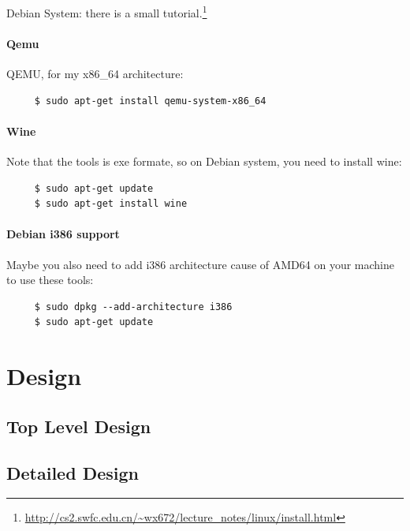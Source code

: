 \documentclass{swfcthesis}
\begin{document}
Debian System: there is a small
tutorial.\footnote{\url{http://cs2.swfc.edu.cn/~wx672/lecture_notes/linux/install.html}}

\subsubsection{Qemu}
\label{sec:qemu}


QEMU, for my x86\_64 architecture: 
\begin{verbatim}
     $ sudo apt-get install qemu-system-x86_64
\end{verbatim}

\subsubsection{Wine}
\label{sec:wine}


Note that the tools is exe formate, so on Debian system, you need to install wine:
\begin{verbatim}
     $ sudo apt-get update
     $ sudo apt-get install wine
\end{verbatim}

\subsubsection{Debian i386 support}
\label{sec:debian-i386-support}

Maybe you also need to add i386 architecture cause of AMD64 on your machine to use these
tools:

\begin{verbatim}
     $ sudo dpkg --add-architecture i386
     $ sudo apt-get update
\end{verbatim}

\chapter{Design}

\section{Top Level Design}
\label{sec:top-level-design}



\section{Detailed Design}
\label{sec:detailed-design}
\end{document}
